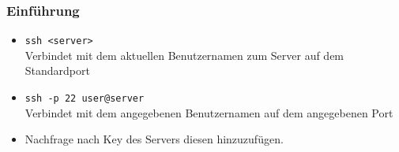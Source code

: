 \begin{frame}
\frametitle{Einführung}
\begin{itemize}
\item \texttt{ssh <server>}\\Verbindet mit dem aktuellen Benutzernamen zum Server auf dem Standardport
\pause
\item \texttt{ssh -p 22 user@server}\\Verbindet mit dem angegebenen Benutzernamen auf dem angegebenen Port
\pause
\item Nachfrage nach Key des Servers diesen hinzuzufügen.
\end{itemize}
\end{frame}